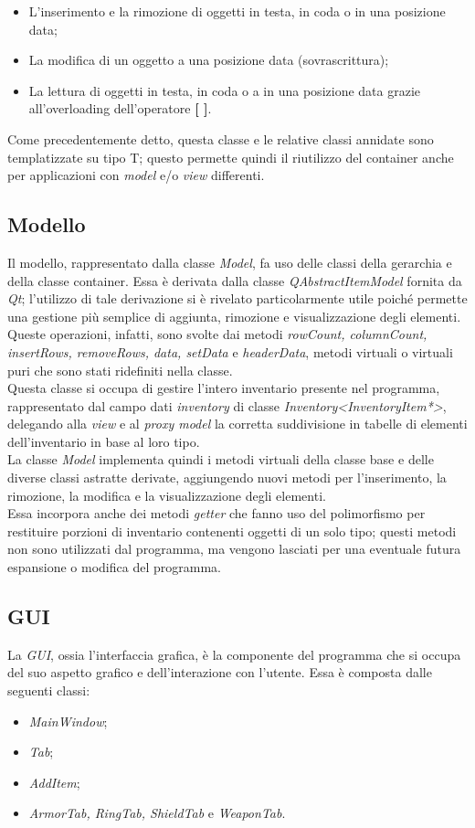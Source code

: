 \begin{itemize}
  \item L'inserimento e la rimozione di oggetti in testa, in coda o in una posizione data;
  \item La modifica di un oggetto a una posizione data (sovrascrittura);
  \item La lettura di oggetti in testa, in coda o a in una posizione data grazie all'overloading dell'operatore \textbf{[ ]}.
\end{itemize}
Come precedentemente detto, questa classe e le relative classi annidate sono templatizzate su tipo T; questo permette quindi il riutilizzo del container anche per applicazioni con \textit{model} e/o \textit{view} differenti.

\subsection{Modello}
Il modello, rappresentato dalla classe \textit{Model}, fa uso delle classi della gerarchia e della classe container. Essa è derivata dalla classe \textit{QAbstractItemModel} fornita da \textit{Qt}; l'utilizzo di tale derivazione si è rivelato particolarmente utile poiché permette una gestione più semplice di aggiunta, rimozione e visualizzazione degli elementi. Queste operazioni, infatti, sono svolte dai metodi \textit{rowCount, columnCount, insertRows, removeRows, data, setData} e \textit{headerData}, metodi virtuali o virtuali puri che sono stati ridefiniti nella classe. \\
Questa classe si occupa di gestire l'intero inventario presente nel programma, rappresentato dal campo dati \textit{inventory} di classe \textit{Inventory<InventoryItem*>}, delegando alla \textit{view} e al \textit{proxy model} la corretta suddivisione in tabelle di elementi dell'inventario in base al loro tipo. \\
La classe \textit{Model} implementa quindi i metodi virtuali della classe base e delle diverse classi astratte derivate, aggiungendo nuovi metodi per l'inserimento, la rimozione, la modifica e la visualizzazione degli elementi. \\
Essa incorpora anche dei metodi \textit{getter} che fanno uso del polimorfismo per restituire porzioni di inventario contenenti oggetti di un solo tipo; questi metodi non sono utilizzati dal programma, ma vengono lasciati per una eventuale futura espansione o modifica del programma.

\subsection{GUI}
La \textit{GUI}, ossia l'interfaccia grafica, è la componente del programma che si occupa del suo aspetto grafico e dell'interazione con l'utente. Essa è composta dalle seguenti classi:
\begin{itemize}
  \item \textit{MainWindow};
  \item \textit{Tab};
  \item \textit{AddItem};
  \item \textit{ArmorTab, RingTab, ShieldTab} e \textit{WeaponTab}.
\end{itemize}

